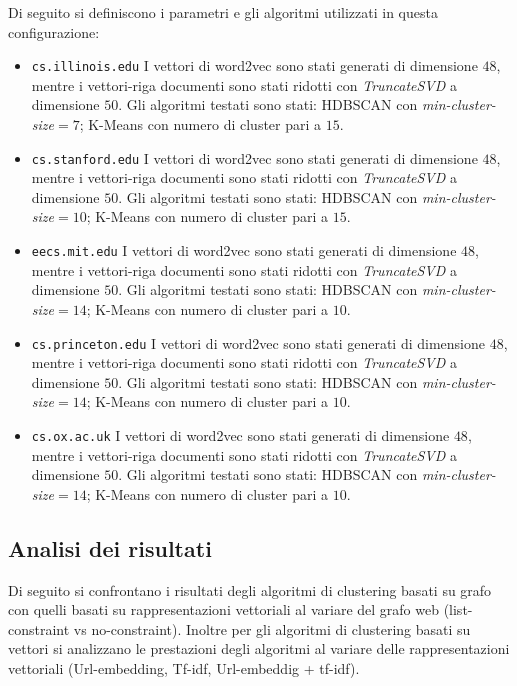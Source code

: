 Di seguito si definiscono i parametri e gli algoritmi utilizzati in questa configurazione:
\begin{itemize}
\item \texttt{cs.illinois.edu} I vettori di word2vec sono stati generati di dimensione $48$, mentre i vettori-riga documenti sono stati ridotti con \textit{TruncateSVD} a dimensione $50$. Gli algoritmi testati sono stati: HDBSCAN con \textit{min-cluster-size}$=7$; K-Means con numero di cluster pari a $15$.
\item \texttt{cs.stanford.edu} I vettori di word2vec sono stati generati di dimensione $48$, mentre i vettori-riga documenti sono stati ridotti con \textit{TruncateSVD} a dimensione $50$. Gli algoritmi testati sono stati: HDBSCAN con \textit{min-cluster-size}$=10$; K-Means con numero di cluster pari a $15$. 
\item \texttt{eecs.mit.edu} I vettori di word2vec sono stati generati di dimensione $48$, mentre i vettori-riga documenti sono stati ridotti con \textit{TruncateSVD} a dimensione $50$. Gli algoritmi testati sono stati: HDBSCAN con \textit{min-cluster-size}$=14$; K-Means con numero di cluster pari a $10$. 
\item \texttt{cs.princeton.edu} I vettori di word2vec sono stati generati di dimensione $48$, mentre i vettori-riga documenti sono stati ridotti con \textit{TruncateSVD} a dimensione $50$. Gli algoritmi testati sono stati: HDBSCAN con \textit{min-cluster-size}$=14$; K-Means con numero di cluster pari a $10$. 
\item \texttt{cs.ox.ac.uk} I vettori di word2vec sono stati generati di dimensione $48$, mentre i vettori-riga documenti sono stati ridotti con \textit{TruncateSVD} a dimensione $50$. Gli algoritmi testati sono stati: HDBSCAN con \textit{min-cluster-size}$=14$; K-Means con numero di cluster pari a $10$.
\end{itemize}

\subsection{Analisi dei risultati}
Di seguito si confrontano i risultati degli algoritmi di clustering basati su grafo con quelli basati su rappresentazioni vettoriali al variare del grafo web (list-constraint vs no-constraint).
Inoltre per gli algoritmi di clustering basati su vettori si analizzano le prestazioni degli algoritmi al variare delle rappresentazioni vettoriali (Url-embedding, Tf-idf, Url-embeddig + tf-idf).

